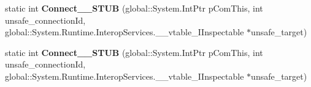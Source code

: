 \begin{DoxyCompactItemize}
\item 
\mbox{\label{struct_windows_1_1_u_i_1_1_xaml_1_1_markup_1_1_i_component_connector_____impl_1_1_vtbl_a0d1abbe4d861132c7a7441f6d127930f}} 
static int {\bfseries Connect\+\_\+\+\_\+\+S\+T\+UB} (global\+::\+System.\+Int\+Ptr p\+Com\+This, int unsafe\+\_\+connection\+Id, global\+::\+System.\+Runtime.\+Interop\+Services.\+\_\+\+\_\+vtable\+\_\+\+I\+Inspectable $\ast$unsafe\+\_\+target)
\item 
\mbox{\label{struct_windows_1_1_u_i_1_1_xaml_1_1_markup_1_1_i_component_connector_____impl_1_1_vtbl_a0d1abbe4d861132c7a7441f6d127930f}} 
static int {\bfseries Connect\+\_\+\+\_\+\+S\+T\+UB} (global\+::\+System.\+Int\+Ptr p\+Com\+This, int unsafe\+\_\+connection\+Id, global\+::\+System.\+Runtime.\+Interop\+Services.\+\_\+\+\_\+vtable\+\_\+\+I\+Inspectable $\ast$unsafe\+\_\+target)
\end{DoxyCompactItemize}
